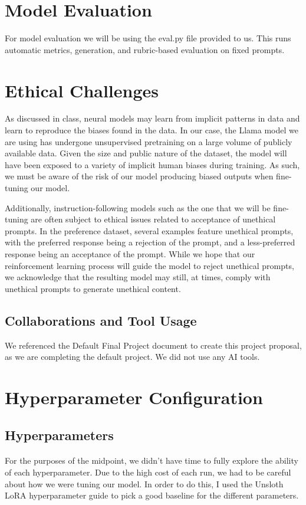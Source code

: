 \documentclass[11pt]{article}
\begin{document}
\section{Model Evaluation}
For model evaluation we will be using the eval.py file provided to us. This runs automatic metrics, generation, and rubric-based evaluation on fixed prompts.

\section{Ethical Challenges}
As discussed in class, neural models may learn from implicit patterns in data and learn to reproduce the biases found in the data. In our case, the Llama model we are using has undergone unsupervised pretraining on a large volume of publicly available data. Given the size and public nature of the dataset, the model will have been exposed to a variety of implicit human biases during training. As such, we must be aware of the risk of our model producing biased outputs when fine-tuning our model. 

Additionally, instruction-following models such as the one that we will be fine-tuning are often subject to ethical issues related to acceptance of unethical prompts. In the preference dataset, several examples feature unethical prompts, with the preferred response being a rejection of the prompt, and a less-preferred response being an acceptance of the prompt. While we hope that our reinforcement learning process will guide the model to reject unethical prompts, we acknowledge that the resulting model may still, at times, comply with unethical prompts to generate unethical content. 

\subsection{Collaborations and Tool Usage}
We referenced the Default Final Project document to create this project proposal, as we are completing the default project. We did not use any AI tools. 


\section{Hyperparameter Configuration}
\subsection{Hyperparameters}
\paragraph{}For the purposes of the midpoint, we didn't have time to fully explore the ability of each hyperparameter. Due to the high cost of each run, we had to be careful about how we were tuning our model. In order to do this, I used the Unsloth LoRA hyperparameter guide \cite{unsloth_lora} to pick a good baseline for the different parameters.
\end{document}
